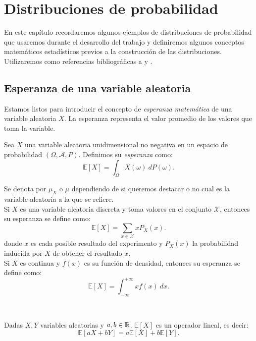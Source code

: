 \documentclass[oneside,openright,titlepage,numbers=noenddot,openany,headinclude,footinclude=true,
cleardoublepage=empty,abstractoff,BCOR=5mm,paper=a4,fontsize=12pt,main=spanish]{scrreprt}
\begin{document}
\chapter{Distribuciones de probabilidad} \label{ch:disprob}

En este capítulo recordaremos algunos ejemplos de distribuciones de probabilidad que usaremos durante el desarrollo del trabajo y definiremos algunos conceptos matemáticos estadísticos previos a la construcción de las distribuciones. Utilizaremos como referencias bibliográficas a \cite{random2004} y \cite{probability2014}.

\section{Esperanza de una variable aleatoria}

Estamos listos para introducir el concepto de \textit{esperanza matemática} de una variable aleatoria $X$. La esperanza representa el valor promedio de los valores que toma la variable.\\


\begin{definition}
Sea $X$ una variable aleatoria unidimensional no negativa en un espacio de probabilidad $(\Omega, \mathcal{A},P)$. Definimos su \textit{esperanza} como: $$\mathbb{E}[X]=\int_{\Omega} X(\omega) \ dP(\omega).$$

Se denota por $\mu_X$ o $\mu$ dependiendo de si queremos destacar o no cual es la variable aleatoria a la que se refiere.\\

Si $X$ es una variable aleatoria discreta y toma valores en el conjunto $\mathcal{X}$, entonces su esperanza se define como: $$\mathbb{E}[X]=\sum_{x\in \mathcal{X}} x P_X(x).$$ donde $x$ es cada posible resultado del experimento y $P_X(x)$ la probabilidad inducida por $X$ de obtener el resultado $x$.\\

Si $X$ es continua y $f(x)$ es su función de densidad, entonces su esperanza se define como: $$\mathbb{E}[X]=\int_{-\infty}^{+\infty}x f(x) \ dx.$$
\end{definition}\

\begin{proposition}
Dadas $X,Y$ variables aleatorias y $a,b\in \mathbb{R}$. $\mathbb{E}[X]$ es un operador lineal, es decir: $$\mathbb{E}[aX+bY]=a\mathbb{E}[X]+b\mathbb{E}[Y].$$ 
\end{proposition}
\end{document}
